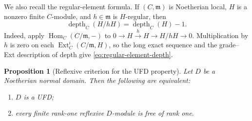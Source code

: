 \documentclass[reqno]{amsart}
\theoremstyle{plain}
\newtheorem{proposition}[theorem]{Proposition}
\theoremstyle{definition}
\newcommand{\depth}{\operatorname{depth}}
\newcommand{\Ext}{\operatorname{Ext}}
\newcommand{\Hom}{\operatorname{Hom}}
\begin{document}
We also recall the regular-element formula.  If $(C,\mathfrak m)$ is
Noetherian local, $H$ is a nonzero finite $C$-module, and
$h\in\mathfrak m$ is $H$-regular, then
\begin{equation}
\label{eq:regular-element-depth}
  \depth_C(H/hH)=\depth_C(H)-1.
\end{equation}
Indeed, apply $\Hom_C(C/\mathfrak m,-)$ to
$0\to H\xrightarrow{h}H\to H/hH\to0$.  Multiplication by $h$ is zero on
each $\Ext_C^i(C/\mathfrak m,H)$, so the long exact sequence and the
grade--Ext description of depth
\cite[Proposition~1.2.10(e)]{BrunsHerzog} give
\eqref{eq:regular-element-depth}.

\begin{proposition}[Reflexive criterion for the UFD property]
\label{prop:reflexive-ufd}
Let $D$ be a Noetherian normal domain.  Then the following are equivalent:
\begin{enumerate}[label=\textup{(\roman*)}]
  \item $D$ is a UFD;
  \item every finite rank-one reflexive $D$-module is free of rank one.
\end{enumerate}
\end{proposition}
\end{document}
